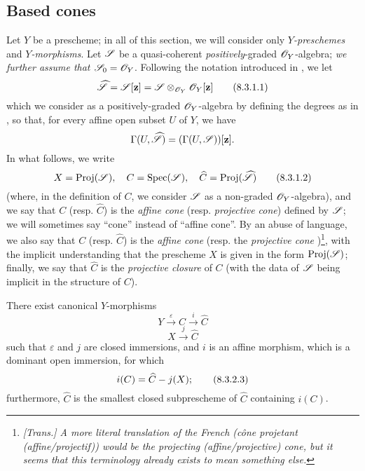 \subsection{Based cones}
\label{subsection:II.8.3}

\begin{env}[8.3.1]
\label{II.8.3.1}
Let $Y$ be a prescheme;
in all of this section, we will consider only \emph{$Y$-preschemes} and \emph{$Y$-morphisms}.
Let $\mathscr{S}$ be a quasi-coherent \emph{positively}-graded $\mathscr{O}_Y$-algebra;
\emph{we further assume that $\mathscr{S}_0=\mathscr{O}_Y$}.
Following the notation introduced in , we let
\[
\label{II.8.3.1.1}
  \widehat{\mathscr{S}} = \mathscr{S}[\mathbf{z}] = \mathscr{S} \otimes_{\mathscr{O}_Y} \mathscr{O}_Y[\mathbf{z}]
\tag{8.3.1.1}
\]
which we consider as a positively-graded $\mathscr{O}_Y$-algebra by defining the degrees as in , so that, for every affine open subset $U$ of $Y$, we have
\[
  \Gamma(U,\widehat{\mathscr{S}}) = (\Gamma(U,\mathscr{S}))[\mathbf{z}].
\]
In what follows, we write
\[
\label{II.8.3.1.2}
  X = \operatorname{Proj}(\mathscr{S}),
  \quad
  C = \operatorname{Spec}(\mathscr{S}),
  \quad
  \widehat{C} = \operatorname{Proj}(\widehat{\mathscr{S}})
\tag{8.3.1.2}
\]
(where, in the definition of $C$, we consider $\mathscr{S}$ as a non-graded $\mathscr{O}_Y$-algebra), and we say that $C$ (resp. $\widehat{C}$) is the \emph{affine cone} (resp. \emph{projective cone}) defined by $\mathscr{S}$;
we will sometimes say ``cone'' instead of ``affine cone''.
By an abuse of language, we also say that $C$ (resp. $\widehat{C}$) is the \emph{affine cone } (resp. the \emph{projective cone })\footnote{\emph{[Trans.] A more literal translation of the French (\emph{c\^one projetant (affine/projectif)}) would be the \emph{projecting (affine/projective) cone}, but it seems that this terminology already exists to mean something else.}}, with the implicit understanding that the prescheme $X$ is given in the form $\operatorname{Proj}(\mathscr{S})$;
finally, we say that $\widehat{C}$ is the \emph{projective closure} of $C$ (with the data of $\mathscr{S}$ being implicit in the structure of $C$).
\end{env}

\begin{proposition}[8.3.2]
\label{II.8.3.2}
There exist canonical $Y$-morphisms
\[
\label{II.8.3.2.1}
  Y \xrightarrow{\varepsilon} C \xrightarrow{i} \widehat{C}
\tag{8.3.2.1}
\]
\[
\label{II.8.3.2.2}
  X \xrightarrow{j} \widehat{C}
\tag{8.3.2.2}
\]
such that $\varepsilon$ and $j$ are closed immersions, and $i$ is an affine morphism, which is a dominant open immersion, for which
\[
\label{II.8.3.2.3}
  i(C) = \widehat{C}- j(X);
\tag{8.3.2.3}
\]
furthermore, $\widehat{C}$ is the smallest closed subprescheme of $\widehat{C}$ containing $i(C)$.
\end{proposition}

